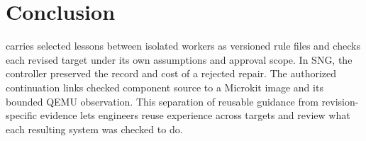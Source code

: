 \section{Conclusion}
\label{sec:conclusion}
\workbench{} carries selected lessons between isolated workers as versioned rule files and checks each revised target under its own assumptions and approval scope. In SNG, the controller preserved the record and cost of a rejected repair. The authorized continuation links checked component source to a Microkit image and its bounded QEMU observation. This separation of reusable guidance from revision-specific evidence lets engineers reuse experience across targets and review what each resulting system was checked to do.
